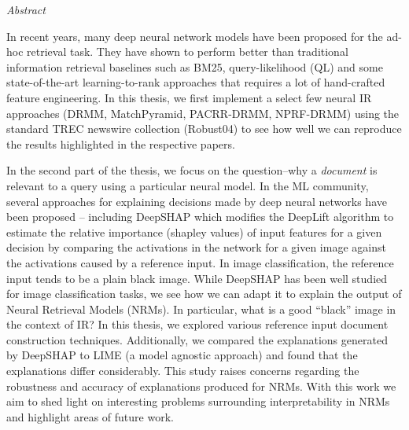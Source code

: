 \documentclass[11pt, oneside]{Thesis} %
\begin{document}
 {\huge{\textit{Abstract}} \par}{ 

In recent years, many deep neural network models have been proposed for the ad-hoc retrieval task. They have shown to perform better than traditional information retrieval baselines such as BM25, query-likelihood (QL) and some state-of-the-art learning-to-rank approaches that requires a lot of hand-crafted feature engineering. In this thesis, we first implement a  select few neural IR approaches (DRMM, MatchPyramid, PACRR-DRMM, NPRF-DRMM) using the standard TREC newswire collection (Robust04) to see how well we can reproduce the results highlighted in the respective papers.

In the second part of the thesis, we focus on the question--why a \textit{document} is relevant to a  query using a particular neural model. In the ML community, several approaches for explaining decisions made by deep neural networks have been proposed -- including DeepSHAP which modifies the DeepLift algorithm to estimate the relative importance (shapley values) of input features for a given decision by comparing the activations in the network for a given image against the activations caused by a reference input. In image classification, the reference input tends to be a plain black image. While DeepSHAP has been well studied for image classification tasks, we see how we can adapt it to explain the output of Neural Retrieval Models (NRMs). In particular, what is a good ``black'' image in the context of IR? In this thesis, we explored various reference input document construction techniques. Additionally, we compared the explanations generated by DeepSHAP to LIME (a model agnostic approach) and found that the explanations differ considerably. This study raises concerns regarding the robustness and accuracy of explanations produced for NRMs. With this work we aim to shed light on interesting problems surrounding interpretability in NRMs and highlight areas of future work.
%

\clearpage %



}
\end{document}
